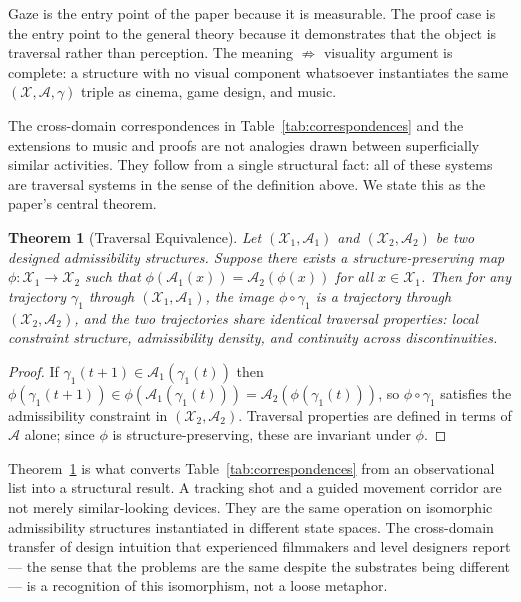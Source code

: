 \documentclass[12pt, a4paper]{article}
\theoremstyle{plain}
\newtheorem{theorem}{Theorem}[section]
\theoremstyle{definition}
\theoremstyle{remark}
\newcommand{\X}{\mathcal{X}}
\newcommand{\A}{\mathcal{A}}
\newcommand{\traj}{\gamma}
\begin{document}
Gaze is the entry point of the paper because it is
measurable. The proof case is the entry point to the general
theory because it demonstrates that the object is traversal
rather than perception. The meaning $\not\Rightarrow$
visuality argument is complete: a structure with no visual
component whatsoever instantiates the same $(\X, \A, \traj)$
triple as cinema, game design, and music.

The cross-domain correspondences in
Table~\ref{tab:correspondences} and the extensions to music
and proofs are not analogies drawn between superficially
similar activities. They follow from a single structural
fact: all of these systems are traversal systems in the
sense of the definition above. We state this as the paper's
central theorem.

\begin{theorem}[Traversal Equivalence]
\label{thm:traversal_equivalence}
  Let $(\X_1, \A_1)$ and $(\X_2, \A_2)$ be two designed
  admissibility structures. Suppose there exists a
  structure-preserving map $\phi : \X_1 \to \X_2$ such that
  $\phi(\A_1(x)) = \A_2(\phi(x))$ for all $x \in \X_1$.
  Then for any trajectory $\traj_1$ through $(\X_1, \A_1)$,
  the image $\phi \circ \traj_1$ is a trajectory through
  $(\X_2, \A_2)$, and the two trajectories share identical
  traversal properties: local constraint structure,
  admissibility density, and continuity across
  discontinuities.
\end{theorem}

\begin{proof}
  If $\traj_1(t+1) \in \A_1(\traj_1(t))$ then
  $\phi(\traj_1(t+1)) \in \phi(\A_1(\traj_1(t)))
  = \A_2(\phi(\traj_1(t)))$, so $\phi \circ \traj_1$
  satisfies the admissibility constraint in $(\X_2, \A_2)$.
  Traversal properties are defined in terms of $\A$ alone;
  since $\phi$ is structure-preserving, these are invariant
  under $\phi$.
\end{proof}

Theorem~\ref{thm:traversal_equivalence} is what converts
Table~\ref{tab:correspondences} from an observational list
into a structural result. A tracking shot and a guided
movement corridor are not merely similar-looking devices.
They are the same operation on isomorphic admissibility
structures instantiated in different state spaces. The
cross-domain transfer of design intuition that experienced
filmmakers and level designers report --- the sense that
the problems are the same despite the substrates being
different --- is a recognition of this isomorphism, not a
loose metaphor.
\end{document}
